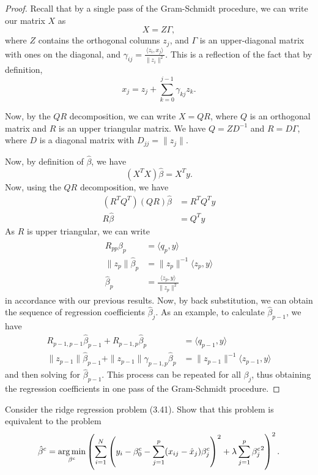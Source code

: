 \begin{proof}
    Recall that by a single pass of the Gram-Schmidt procedure, we can write our matrix $X$ as \[
        X = Z \Gamma,
        \] where $Z$ contains the orthogonal columns $z_j$, and $\Gamma$ is an upper-diagonal matrix with ones on the diagonal, and $\gamma_{ij} = \frac{\langle z_i, x_j \rangle}{\| z_i \|^2}$. This is a reflection of the fact that by definition, \[
            x_j = z_j + \sum_{k=0}^{j-1} \gamma_{kj} z_k.
            \]

            Now, by the $QR$ decomposition, we can write $X = QR$, where $Q$ is an orthogonal matrix and $R$ is an upper triangular matrix.  We have $Q = Z D^{-1}$ and $R = D\Gamma$, where $D$ is a diagonal matrix  with $D_{jj} = \| z_j \|$.  

    Now, by definition of $\hat \beta$, we have \[
        (X^T X) \hat \beta = X^T y.
        \]  Now, using the $QR$ decomposition, we have \begin{align*}
            (R^T Q^T) (QR) \hat \beta &= R^T Q^T y \\
            R \hat \beta &= Q^T y
        \end{align*}
    As $R$ is upper triangular, we can write \begin{align*}
        R_{pp} \hat \beta_p &= \langle q_p, y \rangle \\
        \| z_p \| \hat \beta_p &= \| z_p \|^{-1} \langle z_p, y \rangle \\
        \hat \beta_p &= \frac{\langle z_p, y \rangle}{\| z_p \|^2}
    \end{align*} in accordance with our previous results.  Now, by back substitution, we can obtain the sequence of regression coefficients $\hat \beta_j$.  As an example, to calculate $\hat \beta_{p-1}$, we have \begin{align*}
        R_{p-1, p-1} \hat \beta_{p-1} + R_{p-1,p} \hat \beta_p &= \langle q_{p-1}, y \rangle \\
        \| z_{p-1} \| \hat \beta_{p-1} + \| z_{p-1} \| \gamma_{p-1,p} \hat \beta_p &= \| z_{p-1} \|^{-1} \langle z_{p-1}, y \rangle 
    \end{align*} and then solving for $\hat \beta_{p-1}$. This process can be repeated for all $\beta_j$, thus obtaining the regression coefficients in one pass of the Gram-Schmidt procedure.
\end{proof}

\begin{exer}
    Consider the ridge regression problem (3.41).  Show that this problem is equivalent to the problem \[
        \hat \beta^c = \operatorname*{arg\,min}_{\beta^c} \left( \sum_{i=1}^{N} \left( y_i - \beta^c_0 - \sum_{j=1}^{p}(x_{ij} - \hat x_j) \beta^c_j \right)^2 + \lambda \sum_{j=1}^{p}{\beta_j^c}^2 \right)^2.
        \]
\end{exer}

